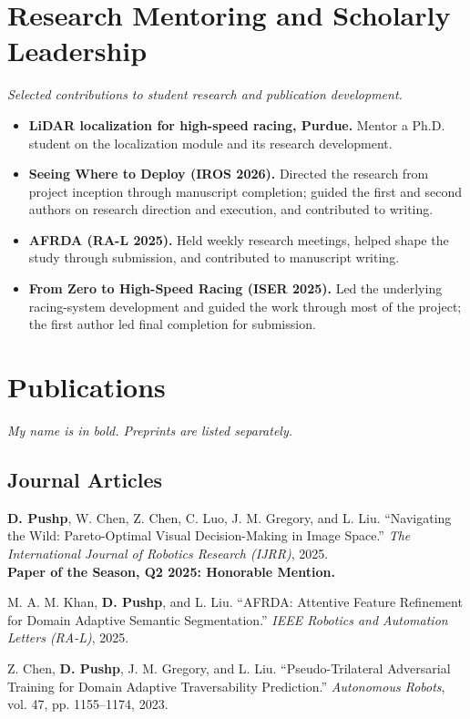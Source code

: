\documentclass[11pt,letterpaper]{article}
\newcommand{\me}{\textbf{D. Pushp}}
\begin{document}
\section{Research Mentoring and Scholarly Leadership}
\textit{Selected contributions to student research and publication development.}
\begin{itemize}
\item \textbf{LiDAR localization for high-speed racing, Purdue.} Mentor a Ph.D. student on the localization module and its research development.
\item \textbf{Seeing Where to Deploy (IROS 2026).} Directed the research from project inception through manuscript completion; guided the first and second authors on research direction and execution, and contributed to writing.
\item \textbf{AFRDA (RA-L 2025).} Held weekly research meetings, helped shape the study through submission, and contributed to manuscript writing.
\item \textbf{From Zero to High-Speed Racing (ISER 2025).} Led the underlying racing-system development and guided the work through most of the project; the first author led final completion for submission.
\end{itemize}

\newpage
\section{Publications}
\textit{My name is in bold. Preprints are listed separately.}
\subsection{Journal Articles}
\begin{enumerate}[label={[J\arabic*]}]
\item \me, W. Chen, Z. Chen, C. Luo, J. M. Gregory, and L. Liu. ``Navigating the Wild: Pareto-Optimal Visual Decision-Making in Image Space.'' \emph{The International Journal of Robotics Research (IJRR)}, 2025.\\\textbf{Paper of the Season, Q2 2025: Honorable Mention.}
\item M. A. M. Khan, \me, and L. Liu. ``AFRDA: Attentive Feature Refinement for Domain Adaptive Semantic Segmentation.'' \emph{IEEE Robotics and Automation Letters (RA-L)}, 2025.
\item Z. Chen, \me, J. M. Gregory, and L. Liu. ``Pseudo-Trilateral Adversarial Training for Domain Adaptive Traversability Prediction.'' \emph{Autonomous Robots}, vol. 47, pp. 1155--1174, 2023.
\end{enumerate}
\end{document}
